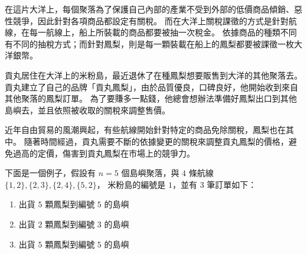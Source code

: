 在這片大洋上，每個聚落為了保護自己內部的產業不受到外部的低價商品傾銷、惡性競爭，因此針對各項商品都設定有關稅。
而在大洋上關稅課徵的方式是針對航線，在每一航線上，船上所裝載的商品都要被抽一次稅金。
依據商品的種類不同有不同的抽稅方式；而針對鳳梨，則是每一顆裝載在船上的鳳梨都要被課徵一枚大洋銀幣。

貢丸居住在大洋上的米粉島，最近退休了在種鳳梨想要販售到大洋的其他聚落去。
貢丸建立了自己的品牌「貢丸鳳梨」，由於品質優良，口碑良好，他開始收到來自其他聚落的鳳梨訂單。
為了要賺多一點錢，他總會想辦法準備好鳳梨出口到其他島嶼去，並且依照被收取的關稅來調整售價。

近年自由貿易的風潮興起，有些航線開始針對特定的商品免除關稅，鳳梨也在其中。
隨著時間經過，貢丸需要不斷的依據變更的關稅來調整貢丸鳳梨的價格，避免過高的定價，傷害到貢丸鳳梨在市場上的競爭力。

\newpage

下面是一個例子，假設有 \begin{math}n=5\end{math} 個島嶼聚落，與
\begin{math}4\end{math} 條航線
\begin{math}\{1,2\}, \{2, 3\}, \{2, 4\}, \{5, 2\}\end{math}，
米粉島的編號是 \begin{math}1\end{math}，並有 \begin{math}3\end{math}
筆訂單如下：

\begin{enumerate}
\def\labelenumi{\arabic{enumi}.}
\tightlist
\item
  出貨 \begin{math}5\end{math} 顆鳳梨到編號 \begin{math}5\end{math}
  的島嶼
\item
  出貨 \begin{math}2\end{math} 顆鳳梨到編號 \begin{math}3\end{math}
  的島嶼
\item
  出貨 \begin{math}5\end{math} 顆鳳梨到編號 \begin{math}5\end{math}
  的島嶼
\end{enumerate}

